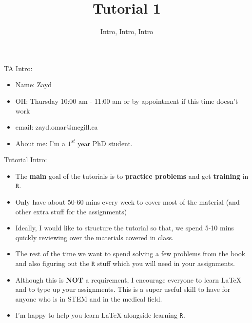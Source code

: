 \documentclass{beamer}
\title{Tutorial 1}
\subtitle{Intro, Intro, Intro}
\begin{document}
	\frame {
		\titlepage
	}
	
	\begin{frame}{TA Intro:}
		\begin{itemize}
			\item Name: Zayd
			\item OH: Thursday 10:00 am - 11:00 am or by appointment if this time doesn't work
			\item email: zayd.omar@mcgill.ca
			\item About me: I'm a $1^{st}$ year PhD student.
		\end{itemize}
	\end{frame}
	
	\begin{frame}{Tutorial Intro:}
		\begin{itemize}
			\item The \textbf{main} goal of the tutorials is to \textbf{practice problems} and get \textbf{training} in $\mathtt{R}$.
			\item Only have about 50-60 mins every week to cover most of the material (and other extra stuff for the assignments)
			\item Ideally, I would like to structure the tutorial so that, we spend 5-10 mins quickly reviewing over the materials covered in class.
			\item The rest of the time we want to spend solving a few problems from the book and also figuring out the $\mathtt{R}$ stuff which you will need in your assignments.
			\item Although this is \textbf{NOT} a requirement, I encourage everyone to learn LaTeX and to type up your assignments. This is a super useful skill to have for anyone who is in STEM and in the medical field. 
			\item I'm happy to help you learn LaTeX alongside learning $\mathtt{R}$.
		\end{itemize}
	\end{frame}
	
\end{document}
